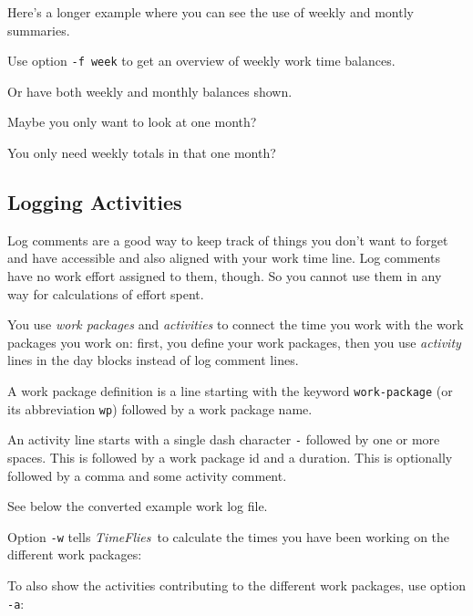 \documentclass[11pt]{article}
\newcommand{\timeflies}{\emph{TimeFlies}}
\begin{document}
Here's a longer example where you can see the use of weekly and montly summaries.



Use option \verb:-f week: to get an overview of weekly work time balances.



Or have both weekly and monthly balances shown.



Maybe you only want to look at one month?



You only need weekly totals in that one month?



\subsection{Logging Activities}

Log comments are a good way to keep track of things you don't want to forget and have accessible and also aligned with your work time line. Log comments have no work effort assigned to them, though. So you cannot use them in any way for calculations of effort spent.

You use \emph{work packages} and \emph{activities} to connect the time you work with the work packages you work on: first, you define your work packages, then you use \emph{activity} lines in the day blocks instead of log comment lines.

A work package definition is a line starting with the keyword \verb:work-package: (or its abbreviation \verb:wp:) followed by a work package name.

An activity line starts with a single dash character \verb:-: followed by one or more spaces. This is followed by a work package id and a duration. This is optionally followed by a comma and some activity comment.

See below the converted example work log file.



Option \verb:-w: tells \timeflies\ to calculate the times you have been working on the different work packages:



To also show the activities contributing to the different work packages, use option \verb:-a::


\end{document}
